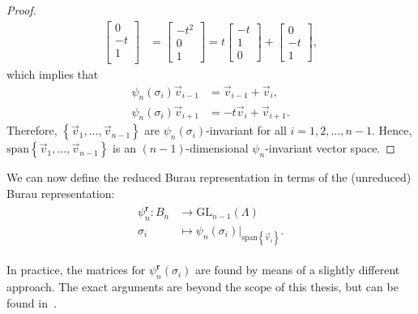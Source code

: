\begin{proof}
\begin{align}
\begin{bmatrix}
            0 \\ -t \\ 1 \\
        \end{bmatrix} &= \begin{bmatrix}
            -t^2 \\ 0 \\ 1
        \end{bmatrix} = t\begin{bmatrix}
            -t \\ 1 \\ 0
        \end{bmatrix} + \begin{bmatrix}
            0 \\ -t \\ 1
        \end{bmatrix},
    \end{align}
    which implies that
    \begin{align}
        \psi_n(\sigma_i)\vec{v}_{i-1} &= \vec{v}_{i-1} + \vec{v}_{i}, \\
        \psi_n(\sigma_i)\vec{v}_{i+1} &= - t\vec{v}_{i} + \vec{v}_{i+1}.
    \end{align}
    Therefore, $\left\{ \vec{v}_1,\dots,\vec{v}_{n-1} \right\}$ are $\psi_n(\sigma_i)$-invariant for all $i=1,2,\dots,n-1$. Hence, $\textrm{span}\left\{ \vec{v}_1,\dots,\vec{v}_{n-1} \right\}$ is an $(n-1)$-dimensional $\psi_n$-invariant vector space.
\end{proof}

We can now define the reduced Burau representation in terms of the (unreduced) Burau representation:
\begin{align}
    \begin{split}        
    \psi_n^\textbf{r}:B_n&\to\textrm{GL}_{n-1}(\Lambda) \\
    \sigma_i&\mapsto \psi_n(\sigma_i)\bigr|_{\textrm{span}\left\{ \vec{v}_i \right\}}.
    \end{split}
\end{align}

In practice, the matrices for $\psi_n^\textbf{r}(\sigma_i)$ are found by means of a slightly different approach. The exact arguments are beyond the scope of this thesis, but can be found in~\cite{Palmer2022}.

